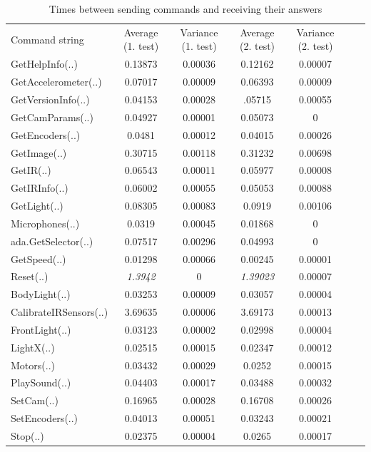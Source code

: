 \begin{table}[!hbp]
\begin{tabular}{lcccccc}
Command string & {\tiny Average (1. test)}  & {\tiny Variance (1. test)}& {\tiny Average (2. test)} & {\tiny Variance (2. test)}\\
GetHelpInfo(..)& 0.13873 & 0.00036& 0.12162&0.00007\\
GetAccelerometer(..)&0.07017&0.00009&  0.06393&0.00009\\ 
GetVersionInfo(..)&0.04153&0.00028&.05715&0.00055\\ 
GetCamParams(..)&0.04927&0.00001&  0.05073&0\\ 
GetEncoders(..)&0.0481&0.00012&  0.04015&0.00026\\ 
GetImage(..)&0.30715 &0.00118& 0.31232&0.00698\\ 
GetIR(..)&0.06543 &0.00011&0.05977&0.00008\\ 
GetIRInfo(..)&0.06002 &0.00055& 0.05053&0.00088\\
GetLight(..)&0.08305 &0.00083&0.0919&0.00106\\
Microphones(..)& 0.0319&0.00045 & 0.01868&0\\
ada.GetSelector(..)& 0.07517&0.00296& 0.04993& 0\\
GetSpeed(..)& 0.01298&0.00066&   0.00245&0.00001\\
Reset(..) &{\it 1.3942} & 0 &{\it 1.39023} &0.00007 \\
BodyLight(..)& 0.03253&0.00009&   0.03057&0.00004\\
CalibrateIRSensors(..)&3.69635&0.00006&3.69173&0.00013\\
FrontLight(..)&0.03123&0.00002 & 0.02998&0.00004\\
LightX(..)& 0.02515&0.00015&  0.02347&0.00012\\
Motors(..)&0.03432&0.00029&  0.0252&0.00015\\
PlaySound(..)& 0.04403& 0.00017&  0.03488&0.00032\\
SetCam(..)& 0.16965& 0.00028& 0.16708&0.00026\\
SetEncoders(..)& 0.04013&0.00051& 0.03243&0.00021\\
Stop(..)&0.02375&0.00004&  0.0265&0.00017\\
\end{tabular}
\caption{Times between sending commands and receiving their answers}
\label{times1}
\end{table}

